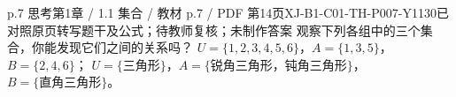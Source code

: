 \par\noindent\begin{minipage}{\linewidth}
\begin{bankitem}{p.7 思考}{第1章 / 1.1 集合 / 教材 p.7 / PDF 第14页}{XJ-B1-C01-TH-P007-Y1130}{已对照原页转写题干及公式；待教师复核；未制作答案}
观察下列各组中的三个集合，你能发现它们之间的关系吗？
$U=\{1,2,3,4,5,6\}$，$A=\{1,3,5\}$，$B=\{2,4,6\}$；
$U=\{\text{三角形}\}$，$A=\{\text{锐角三角形，钝角三角形}\}$，$B=\{\text{直角三角形}\}$。
\end{bankitem}
\end{minipage}\par\medskip
